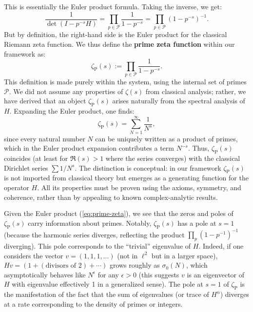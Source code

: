 \documentclass[11pt]{article}
\begin{document}
This is essentially the Euler product formula. Taking the inverse, we get:
\[ \frac{1}{\det(I - p^{-s} H)} = \prod_{p\in\mathcal{P}} \frac{1}{1 - p^{-s}} = \prod_{p\in\mathcal{P}} \left(1 - p^{-s}\right)^{-1}. \]
But by definition, the right-hand side is the Euler product for the classical Riemann zeta function. We thus define the \textbf{prime zeta function} within our framework as:
\begin{equation}\label{eq:prime-zeta}
\zeta_{\mathrm{P}}(s) := \prod_{p\in\mathcal{P}} \frac{1}{1 - p^{-s}}.
\end{equation}
This definition is made purely within the system, using the internal set of primes $\mathcal{P}$. We did not assume any properties of $\zeta(s)$ from classical analysis; rather, we have derived that an object $\zeta_{\mathrm{P}}(s)$ arises naturally from the spectral analysis of $H$. Expanding the Euler product, one finds:
\[ \zeta_{\mathrm{P}}(s) = \sum_{N=1}^\infty \frac{1}{N^s}, \] 
since every natural number $N$ can be uniquely written as a product of primes, which in the Euler product expansion contributes a term $N^{-s}$. Thus, $\zeta_{\mathrm{P}}(s)$ coincides (at least for $\Re(s) > 1$ where the series converges) with the classical Dirichlet series $\sum 1/N^s$. The distinction is conceptual: in our framework $\zeta_{\mathrm{P}}(s)$ is not imported from classical theory but emerges as a generating function for the operator $H$. All its properties must be proven using the axioms, symmetry, and coherence, rather than by appealing to known complex-analytic results.

Given the Euler product (\ref{eq:prime-zeta}), we see that the zeros and poles of $\zeta_{\mathrm{P}}(s)$ carry information about primes. Notably, $\zeta_{\mathrm{P}}(s)$ has a pole at $s=1$ (because the harmonic series diverges, reflecting the product $\prod_p (1-p^{-1})^{-1}$ diverging). This pole corresponds to the ``trivial'' eigenvalue of $H$. Indeed, if one considers the vector $v = (1,1,1,\dots)$ (not in $\ell^2$ but in a larger space), $Hv = (1+(\text{divisors of }2)+\cdots)$ grows roughly as $\sigma_0(N)$, which asymptotically behaves like $N^\epsilon$ for any $\epsilon>0$ (this suggests $v$ is an eigenvector of $H$ with eigenvalue effectively 1 in a generalized sense). The pole at $s=1$ of $\zeta_{\mathrm{P}}$ is the manifestation of the fact that the sum of eigenvalues (or trace of $H^n$) diverges at a rate corresponding to the density of primes or integers.
\end{document}
